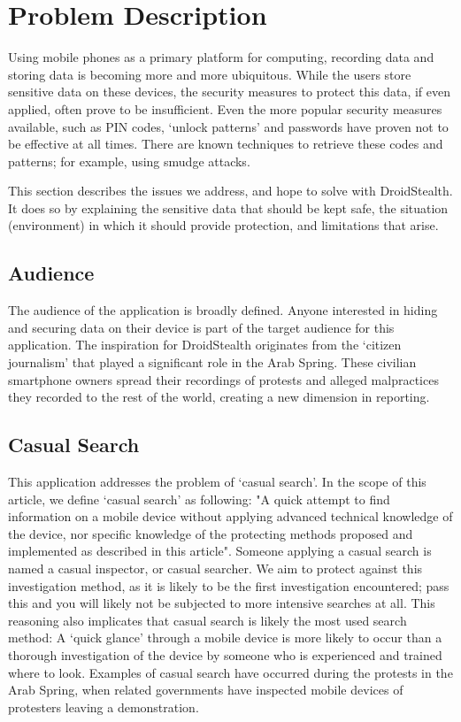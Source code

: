 \section{Problem Description}
\label{sec:problem-description}
Using mobile phones as a primary platform for computing, recording data and storing data is becoming more and more ubiquitous.
While the users store sensitive data on these devices, the security measures to protect this data, if even applied, often prove to be insufficient.
Even the more popular security measures available, such as PIN codes, `unlock patterns' and passwords have proven not to be effective at all times.
There are known techniques to retrieve these codes and patterns; for example, using smudge attacks\cite{aviv2010smudge}.

This section describes the issues we address, and hope to solve with DroidStealth.
It does so by explaining the sensitive data that should be kept safe, the situation (environment) in which it should provide protection, and limitations that arise.

\subsection{Audience}
The audience of the application is broadly defined.
Anyone interested in hiding and securing data on their device is part of the target audience for this application.
The inspiration for DroidStealth originates from the `citizen journalism'\cite{duffy2011} that played a significant role in the Arab Spring. 
These civilian smartphone owners spread their recordings of protests and alleged malpractices they recorded to the rest of the world, creating a new dimension in reporting.

\subsection{Casual Search}
This application addresses the problem of `casual search'.
In the scope of this article, we define `casual search' as following: 
"A quick attempt to find information on a mobile device without applying advanced technical knowledge of the device, nor specific knowledge of the protecting methods proposed and implemented as described in this article".
Someone applying a casual search is named a casual inspector, or casual searcher.
We aim to protect against this investigation method, as it is likely to be the first investigation encountered; pass this and you will likely not be subjected to more intensive searches at all.
This reasoning also implicates that casual search is likely the most used search method:
A `quick glance' through a mobile device is more likely to occur than a thorough investigation of the device by someone who is experienced and trained where to look.
Examples of casual search have occurred during the protests in the Arab Spring, when related governments have inspected mobile devices of protesters leaving a demonstration.

